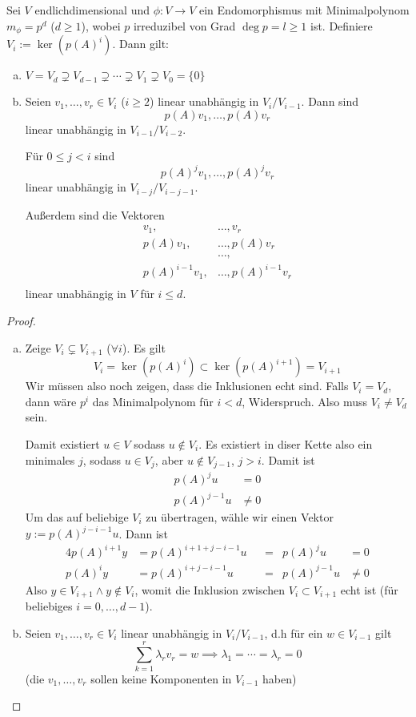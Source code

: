 \documentclass[a4paper, 10pt]{scrbook}
\begin{document}
\begin{lem}
	\label{lem:12.13}
	Sei $V$ endlichdimensional und $\phi:V\to V$ ein Endomorphismus mit Minimalpolynom $m_\phi = p^d$ ($d\ge 1$), wobei $p$ irreduzibel von Grad $\deg p=l\ge 1$ ist.
	Definiere $V_i := \ker(p(A)^i)$.
	Dann gilt:
	\begin{enumerate}[(a)]
		\item
			$V=V_d \supsetneq V_{d-1} \supsetneq \dotsb \supsetneq V_1 \supsetneq V_0=\{0\}$
		\item
			Seien $v_1,\dotsc, v_r \in V_i$ ($i\ge 2$) linear unabhängig in $V_i/ V_{i-1}$.
			Dann sind 
			\[
				p(A)v_1,\dotsc, p(A)v_r
			\]
			linear unabhängig in $V_{i-1}/ V_{i-2}$.
			
			Für $0\le j<i$ sind 
			\[
				p(A)^jv_1, \dotsc, p(A)^jv_r
			\]
			linear unabhängig in $V_{i-j}/V_{i-j-1}$.

			Außerdem sind die Vektoren
			\begin{align*}
				v_1,&\dotsc, v_r \\
				p(A)v_1,&\dotsc, p(A)v_r \\
				 & \dotsc, \\
				p(A)^{i-1}v_1,&\dotsc, p(A)^{i-1}v_r \\
			\end{align*}
			linear unabhängig in $V$ für $i\le d$.
	\end{enumerate}
	\begin{proof}
		\begin{enumerate}[(a)]
			\item
				Zeige $V_i \subsetneq V_{i+1}$ ($\forall i$).
				Es gilt
				\[
					V_i=\ker(p(A)^i) \subset \ker(p(A)^{i+1})=V_{i+1}
				\]
				Wir müssen also noch zeigen, dass die Inklusionen echt sind.
				Falls $V_i=V_d$, dann wäre $p^i$ das Minimalpolynom für $i<d$, Widerspruch.
				Also muss $V_i\neq V_d$ sein.

				Damit existiert $u\in V$ sodass $u\not\in V_i$.
				Es existiert in diser Kette also ein minimales $j$, sodass $u\in V_j$, aber $u\not \in V_{j-1}$, $j>i$.
				Damit ist
				\begin{align*}
					p(A)^j u &= 0 \\
					p(A)^{j-1}u &\neq 0
				\end{align*}
				Um das auf beliebige $V_i$ zu übertragen, wähle wir einen Vektor $y:= p(A)^{j-i-1}u$.
				Dann ist
				\begin{alignat*}{4}
					p(A)^{i+1}y &= p(A)^{i+1+j-i-1}u &&= &p(A)^ju &= 0 \\
					   p(A)^i y &= p(A)^{i+j-i-1}u&&= &p(A)^{j-1} u &\neq 0
				\end{alignat*}
				Also $y\in V_{i+1} \land y\not\in V_i$, womit die Inklusion zwischen $V_{i} \subset V_{i+1}$ echt ist (für beliebiges $i=0,\dotsc,d-1$).				
			\item
				Seien $v_1,\dotsc, v_r \in V_i$ linear unabhängig in $V_i/ V_{i-1}$, d.h für ein $w\in V_{i-1}$ gilt
				\[
					\sum_{k=1}^{r}\lambda_rv_r = w \implies \lambda_1 = \dotsb = \lambda_r = 0
				\]
				(die $v_1,\dotsc,v_r$ sollen keine Komponenten in $V_{i-1}$ haben)


\end{enumerate}
\end{proof}
\end{lem}
\end{document}
